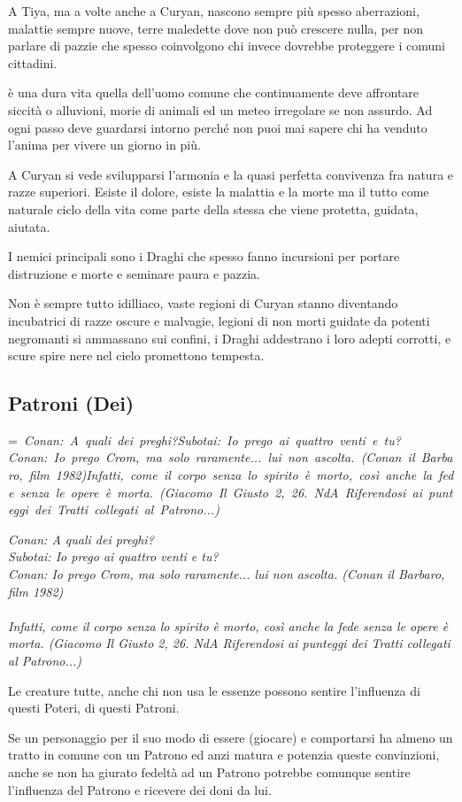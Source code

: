 \documentclass[a4paper,11pt,twoside,openany]{book}
\makeatletter
\newcommand{\mybox}[1]{%
	\setbox0=\hbox{#1}%
	\setlength{\@tempdima}{\dimexpr\wd0+13pt}%
	\begin{tcolorbox}[boxrule=0.5pt,arc=4pt, breakable,enhanced,
		left=6pt,right=6pt,top=6pt,bottom=6pt,boxsep=0pt,width=\@tempdima]
		#1
	\end{tcolorbox}
}
\makeatother
\begin{document}
{A Tiya, ma a volte anche a Curyan, nascono sempre più spesso aberrazioni, malattie sempre nuove, terre maledette dove non può crescere nulla, per non parlare di pazzie che spesso coinvolgono chi invece dovrebbe proteggere i comuni cittadini.

è una dura vita quella dell'uomo comune che continuamente deve affrontare siccità o alluvioni, morie di animali ed un meteo irregolare se non assurdo. Ad ogni passo deve guardarsi intorno perché non puoi mai sapere chi ha venduto l'anima per vivere un giorno in più.

A Curyan si vede svilupparsi l'armonia e la quasi perfetta convivenza fra natura e razze superiori. Esiste il dolore, esiste la malattia e la morte ma il tutto come naturale ciclo della vita come parte della stessa che viene protetta, guidata, aiutata.

I nemici principali sono i Draghi che spesso fanno incursioni per portare distruzione e morte e seminare paura e pazzia.

Non è sempre tutto idilliaco, vaste regioni di Curyan stanno diventando incubatrici di razze oscure e malvagie, legioni di non morti guidate da potenti negromanti si ammassano sui confini, i Draghi addestrano i loro adepti corrotti, e scure spire nere nel cielo promettono tempesta.

\pagebreak

\subsection{Patroni (Dei)}

\label{patroni-dei}
\mybox{\textit{
Conan: A quali dei preghi?\\
Subotai: Io prego ai quattro venti e tu?\\
Conan: Io prego Crom, ma solo raramente... lui non ascolta. (Conan il Barbaro, film 1982)\\\\
Infatti, come il corpo senza lo spirito è morto, così anche la fede senza le opere è morta. (Giacomo Il Giusto 2, 26. NdA Riferendosi ai punteggi dei Tratti collegati al Patrono...)}}\medskip

Le creature tutte, anche chi non usa le essenze possono sentire l'influenza di questi Poteri, di questi Patroni.

Se un personaggio per il suo modo di essere (giocare) e comportarsi ha almeno un tratto in comune con un Patrono ed anzi matura e potenzia queste convinzioni, anche se non ha giurato fedeltà ad un Patrono potrebbe comunque sentire l'influenza del Patrono e ricevere dei doni da lui.

}
\end{document}
